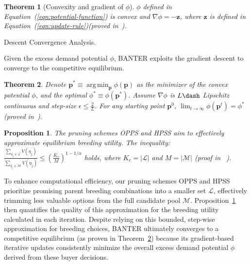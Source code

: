 \documentclass[conference]{IEEEtran}
\theoremstyle{plain}
\newtheorem{theorem}{Theorem}
\newtheorem{proposition}{Proposition}
\DeclareMathOperator*{\argmin}{arg\,min}
\newcommand*{\defeq}{\equiv}
\begin{document}
\begin{theorem}[Convexity and gradient of $\phi$]
\label{thm:convexity-gradient}
    $\phi$ defined in Equation~(\ref{eqn:potential-function}) is convex and $\nabla\phi = -\mathbf{z}$, where $\mathbf{z}$ is defined in Equation~(\ref{eqn:update-rule})(proved in~\cite{supplementary}).

\end{theorem}

\noindentGradient Descent Convergence Analysis.

Given the excess demand potential $\phi$, BANTER exploits the gradient descent to converge to the competitive equilibrium.

\begin{theorem}
\label{thm:convergence}
    Denote $\mathbf{p}^*\defeq\argmin_\mathbf{p}\phi(\mathbf{p})$ as the minimizer of the convex potential $\phi$, and the optimal $\phi^* \defeq \phi(\mathbf{p}^*)$. Assume $\nabla\phi$ is $L\dash$ Lipschitz continuous and step-size $\epsilon\leq \frac{2}{L}$. For any starting point $\mathbf{p}^0$, $\lim_{t\rightarrow\infty} \phi(\mathbf{p}^t) = \phi^*$(proved in~\cite{supplementary}).

\end{theorem}

\begin{proposition}
\label{prop:pruning_approx}
    The pruning schemes OPPS and HPSS aim to effectively approximate equilibrium breeding utility. The inequality: \(\frac{\sum_{\eta_j \in \mathcal{L}} V(\eta_j)}{\sum_{\eta_j \in \mathcal{M}} V(\eta_j)} \leq \left( \frac{K_c}{M} \right)^{1 - 1/\alpha} \) holds, where \( K_c = |\mathcal{L}| \) and \( M = |\mathcal{M}| \) (proof in ~\cite{supplementary}).

\end{proposition}

To enhance computational efficiency, our pruning schemes OPPS and HPSS prioritize promising parent breeding combinations into a smaller set $\mathcal{L}$, effectively trimming less valuable options from the full candidate pool $\mathcal{M}$.
Proposition~\ref{prop:pruning_approx} then quantifies the quality of this approximation for the breeding utility calculated in each iteration. Despite relying on this bounded, step-wise approximation for breeding choices, BANTER ultimately converges to a competitive equilibrium (as proven in Theorem~\ref{thm:convergence}) because its gradient-based iterative updates consistently minimize the overall excess demand potential $\phi$ derived from these buyer decisions.
\end{document}
